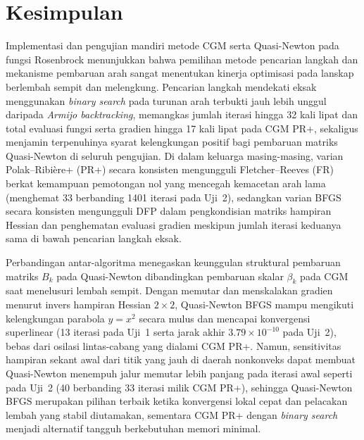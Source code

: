 \documentclass[12pt,a4paper]{article}
\begin{document}
\section{Kesimpulan}
Implementasi dan pengujian mandiri metode CGM serta Quasi-Newton pada fungsi Rosenbrock menunjukkan bahwa pemilihan
metode pencarian langkah dan mekanisme pembaruan arah sangat menentukan kinerja optimisasi pada lanskap berlembah sempit
dan melengkung. Pencarian langkah mendekati eksak menggunakan \emph{binary search} pada turunan arah terbukti jauh lebih
unggul daripada \emph{Armijo backtracking}, memangkas jumlah iterasi hingga 32 kali lipat dan total evaluasi fungsi
serta gradien hingga 17 kali lipat pada CGM PR+, sekaligus menjamin terpenuhinya syarat kelengkungan positif bagi
pembaruan matriks Quasi-Newton di seluruh pengujian. Di dalam keluarga masing-masing, varian Polak--Ribi\`ere+ (PR+)
secara konsisten mengungguli Fletcher--Reeves (FR) berkat kemampuan pemotongan nol yang mencegah kemacetan arah lama
(menghemat 33 berbanding 1401 iterasi pada Uji~2), sedangkan varian BFGS secara konsisten mengungguli DFP dalam
pengkondisian matriks hampiran Hessian dan penghematan evaluasi gradien meskipun jumlah iterasi keduanya sama di bawah
pencarian langkah eksak.

Perbandingan antar-algoritma menegaskan keunggulan struktural pembaruan matriks $B_k$ pada Quasi-Newton dibandingkan
pembaruan skalar $\beta_k$ pada CGM saat menelusuri lembah sempit. Dengan memutar dan menskalakan gradien menurut
invers hampiran Hessian $2\times2$, Quasi-Newton BFGS mampu mengikuti kelengkungan parabola $y=x^2$ secara mulus dan
mencapai konvergensi superlinear (13 iterasi pada Uji~1 serta jarak akhir $3.79\times10^{-10}$ pada Uji~2), bebas dari
osilasi lintas-cabang yang dialami CGM PR+. Namun, sensitivitas hampiran sekant awal dari titik yang jauh di daerah
nonkonveks dapat membuat Quasi-Newton menempuh jalur memutar lebih panjang pada iterasi awal seperti pada Uji~2 (40
berbanding 33 iterasi milik CGM PR+), sehingga Quasi-Newton BFGS merupakan pilihan terbaik ketika konvergensi lokal
cepat dan pelacakan lembah yang stabil diutamakan, sementara CGM PR+ dengan \emph{binary search} menjadi alternatif
tangguh berkebutuhan memori minimal.
\end{document}
